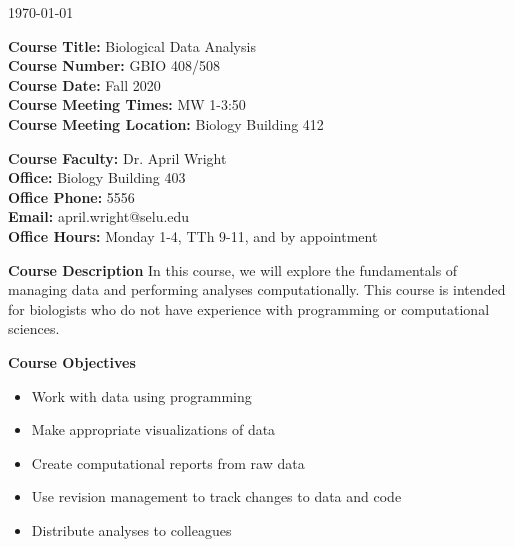 \documentclass[12pt]{article}
\let\oldtextbf\textbf
\renewcommand{\textbf}[1]{\textcolor{coolblack}{\oldtextbf{#1}}}
\begin{document}
\thispagestyle{fancy}
\begin{flushright}
\today
\end{flushright}
\vspace{2mm}
\begin{flushleft}
\textbf{Course Title:} Biological Data Analysis \\
\textbf{Course Number:} GBIO 408/508\\


\textbf{Course Date:} Fall 2020 \\

\textbf{Course Meeting Times:} MW 1-3:50 \\
\textbf{Course Meeting Location:} Biology Building 412 \\
\end{flushleft}

\bigskip

\begin{flushleft}
\textbf{Course Faculty:} Dr. April Wright \\
\textbf{Office:} Biology Building 403\\
\textbf{Office Phone:} 5556 \\
\textbf{Email:} april.wright@selu.edu   \\
\textbf{Office Hours:} Monday 1-4, TTh 9-11, and by appointment \\

\end{flushleft}

\bigskip

\begin{flushleft}

\textbf{Course Description}
In this course, we will explore the fundamentals of managing data and performing analyses computationally. This course is intended for biologists who do not have experience with programming or computational sciences. 

\end{flushleft}

\bigskip
\begin{flushleft}

\textbf{Course Objectives}

\begin{itemize}

\item Work with data using programming
\item Make appropriate visualizations of data
\item Create computational reports from raw data
\item Use revision management to track changes to data and code
\item Distribute analyses to colleagues

\end{itemize}
\end{flushleft}
\end{document}
